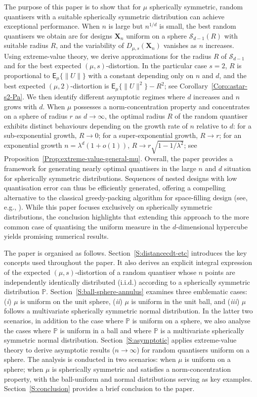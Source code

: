 \documentclass{article}
\def\Xb{\mathbf{X}}
\def\Ex{\mathsf{E}}
\def\ml{\lambda}
\newcommand{\vsp} {\vspace{0.3cm}}
\def\PP{\mathbb{P}}
\def\SS{{\mathcal S}}
\begin{document}
The purpose of this paper is to show that for $\mu$ spherically symmetric, random quantisers with a suitable spherically symmetric distribution can achieve exceptional performance. When $n$ is large but $n^{1/d}$ is small, the best random quantisers we obtain are for designs $\Xb_n$ uniform on a sphere $\SS_{d-1}(R)$ with suitable radius $R$, and the variability of $D_{\mu,s}(\Xb_n)$ vanishes as $n$ increases. Using extreme-value theory, we derive approximations for the radius $R$ of $\SS_{d-1}$ and for the best expected $(\mu,s)$-distortion. In the particular case $s=2$, $R$ is proportional to $\Ex_\mu\{\|U\|\}$ with a constant depending only on $n$ and $d$, and the best expected $(\mu,2)$-distortion is $\Ex_\mu\{\|U\|^2\}-R^2$; see Corollary~\ref{Coro:astar-s2-Pa}. We then identify different asymptotic regimes where $d$ increases and $n$ grows with $d$. When $\mu$ possesses a norm-concentration property and concentrates on a sphere of radius $r$ as $d \to \infty$, the optimal radius $R$ of the random quantiser exhibits distinct behaviours depending on the growth rate of $n$ relative to $d$:
for a sub-exponential growth, $R \to 0$; for a super-exponential growth, $R \to r$; for an exponential growth $n = \ml^d(1 + o(1))$, $R \to r\sqrt{1 - 1/\ml^2}$; see Proposition~\ref{Prop:extreme-value-general-mu}.
Overall, the paper provides a framework for generating nearly optimal quantisers in the large $n$ and $d$ situation for spherically symmetric distributions.
Sequences of nested designs with low quantisation error can thus be efficiently generated, offering a compelling alternative to the classical greedy-packing algorithm for space-filling design (see, e.g., \cite{PZ2022}). While this paper focuses exclusively on spherically symmetric distributions, the conclusion highlights that extending this approach to the more common case of quantising the uniform measure in the $d$-dimensional hypercube yields promising numerical results.

\vsp
The paper is organised as follows. Section~\ref{S:distancecdt-etc} introduces the key concepts used throughout the paper. It also derives an explicit integral expression of the expected $(\mu,s)$-distortion of a random quantiser whose $n$ points are independently identically distributed (i.i.d.) according to a spherically symmetric distribution $\PP$. Section~\ref{S:ball-sphere-annulus} examines three emblematic cases: (\textit{i}) $\mu$ is uniform on the unit sphere, (\textit{ii}) $\mu$ is uniform in the unit ball, and (\textit{iii}) $\mu$ follows a multivariate spherically symmetric normal distribution. In the latter two scenarios, in addition to the case where $\PP$ is uniform on a sphere, we also analyse the cases where $\PP$ is uniform in a ball and where $\PP$ is a multivariate spherically symmetric normal distribution. Section~\ref{S:asymptotic} applies extreme-value theory to derive asymptotic results ($n \to \infty$) for random quantisers uniform on a sphere. The analysis is conducted in two scenarios: when $\mu$ is uniform on a sphere; when $\mu$ is spherically symmetric and satisfies a norm-concentration property, with the ball-uniform and normal distributions serving as key examples.
Section~\ref{S:conclusion} provides a brief conclusion to the paper.
\end{document}

